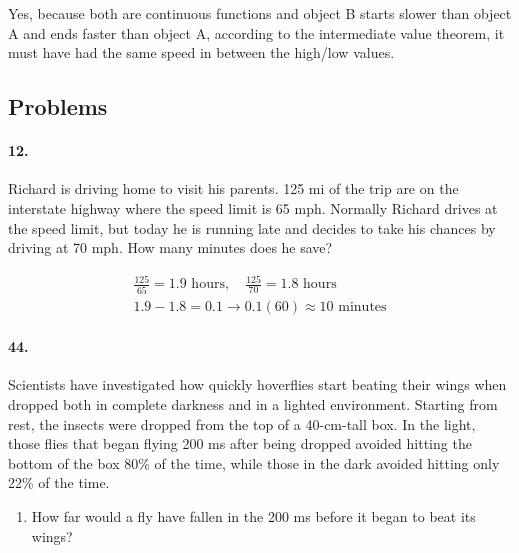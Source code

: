 \begin{multicols*}{2}
\begin{enumerate}[label={\Alph*.}]
            \begin{mdframed}
                Yes, because both are continuous functions and object B starts slower than object A and ends faster than object A, according to the intermediate value theorem, it must have had the same speed in between the high/low values.
            \end{mdframed}
        \end{enumerate} 
        
        \subsection*{Problems}

        \paragraph*{12.}
        Richard is driving home to visit his parents. 125 mi of the trip are on the interstate highway where the speed limit is 65 mph. Normally Richard drives at the speed limit, but today he is running late and decides to take his chances by driving at 70 mph. How many minutes does he save?

        \begin{mdframed}
            \begin{equation*}
                \begin{gathered}
                    \frac{125}{65} = 1.9 \text{ hours}, \quad \frac{125}{70} = 1.8 \text{ hours}  \\
                    1.9 - 1.8 = 0.1 \rightarrow 0.1(60) \approx \boxed{10 \text{ minutes}}
                \end{gathered}
            \end{equation*}
        \end{mdframed}

        \paragraph*{44.}
        Scientists have investigated how quickly hoverflies start beating their wings when dropped both in complete darkness and in a lighted environment. Starting from rest, the insects were dropped from the top of a 40-cm-tall box. In the light, those flies that began flying 200 ms after being dropped avoided hitting the bottom of the box 80\% of the time, while those in the dark avoided hitting only 22\% of the time.

        \begin{enumerate}[label=\alph*.]
            \item How far would a fly have fallen in the 200 ms before it began to beat its wings?
            

\end{enumerate}
\end{multicols*}

